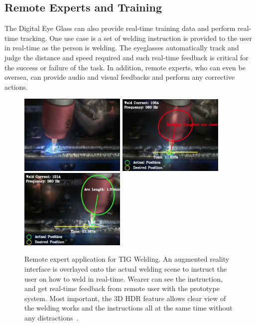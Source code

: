 \subsection{Remote Experts and Training}

The Digital Eye Glass can also provide real-time training data and perform real-time tracking. One 
use case is a set of welding instruction is provided to the user in real-time as the person is welding. 
The eyeglasses automatically track and judge the distance and speed required and such real-time 
feedback is critical for the success or failure of the task. In addition, remote experts, who can even be 
oversea, can provide audio and visual feedbacks and perform any corrective actions. 

\begin{figure}
\center
 \includegraphics[width=2in]{ch2/diagrams/remote1.jpg}
 \includegraphics[width=2in]{ch2/diagrams/remote3.jpg}
 \includegraphics[width=2in]{ch2/diagrams/remote2.jpg}
 \caption{Remote expert application for TIG Welding. An augmented reality interface is overlayed 
onto the actual welding scene to instruct the user on how to weld in real-time. Wearer can see the 
instruction, and get real-time feedback from remote user with the prototype system. Most important, 
the 3D HDR feature allows clear view of the welding works and the instructions all at the same time 
without any distractions~\cite{mann2012hdrchitecture}.}
 \label{fig:extremeremote}
\end{figure}

